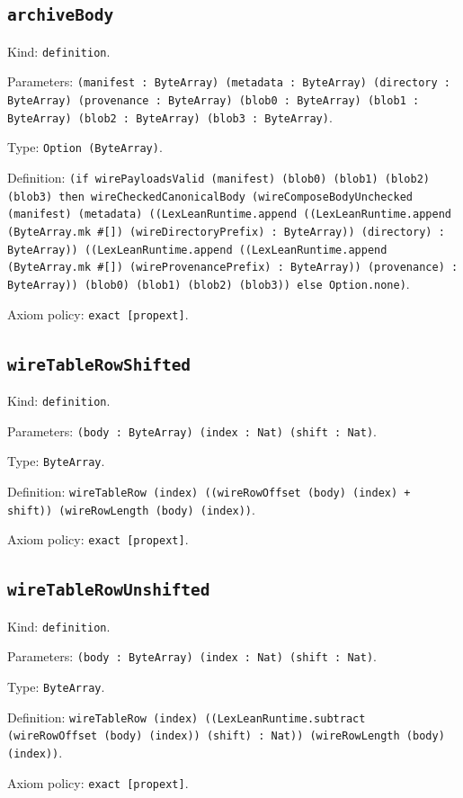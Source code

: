 \documentclass[11pt]{article}
\begin{document}
\subsection*{\texttt{archiveBody}}
\noindent Kind: \texttt{definition}.\par
\noindent Parameters: \texttt{(manifest : ByteArray) (metadata : ByteArray) (directory : ByteArray) (provenance : ByteArray) (blob0 : ByteArray) (blob1 : ByteArray) (blob2 : ByteArray) (blob3 : ByteArray)}.\par
\noindent Type: \texttt{Option (ByteArray)}.\par
\noindent Definition: \texttt{(if wirePayloadsValid (manifest) (blob0) (blob1) (blob2) (blob3) then wireCheckedCanonicalBody (wireComposeBodyUnchecked (manifest) (metadata) ((LexLeanRuntime.append ((LexLeanRuntime.append (ByteArray.mk \#[]) (wireDirectoryPrefix) : ByteArray)) (directory) : ByteArray)) ((LexLeanRuntime.append ((LexLeanRuntime.append (ByteArray.mk \#[]) (wireProvenancePrefix) : ByteArray)) (provenance) : ByteArray)) (blob0) (blob1) (blob2) (blob3)) else Option.none)}.\par
\noindent Axiom policy: \texttt{exact [propext]}.\par
\subsection*{\texttt{wireTableRowShifted}}
\noindent Kind: \texttt{definition}.\par
\noindent Parameters: \texttt{(body : ByteArray) (index : Nat) (shift : Nat)}.\par
\noindent Type: \texttt{ByteArray}.\par
\noindent Definition: \texttt{wireTableRow (index) ((wireRowOffset (body) (index) + shift)) (wireRowLength (body) (index))}.\par
\noindent Axiom policy: \texttt{exact [propext]}.\par
\subsection*{\texttt{wireTableRowUnshifted}}
\noindent Kind: \texttt{definition}.\par
\noindent Parameters: \texttt{(body : ByteArray) (index : Nat) (shift : Nat)}.\par
\noindent Type: \texttt{ByteArray}.\par
\noindent Definition: \texttt{wireTableRow (index) ((LexLeanRuntime.subtract (wireRowOffset (body) (index)) (shift) : Nat)) (wireRowLength (body) (index))}.\par
\noindent Axiom policy: \texttt{exact [propext]}.\par
\end{document}
